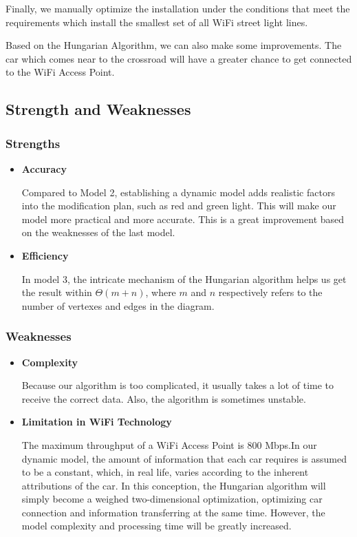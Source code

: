 \documentclass[12pt]{article}
\theoremstyle{definition}
\theoremstyle{remark}
\numberwithin{equation}{section}
\begin{document}
	Finally, we manually optimize the installation under the conditions that meet the requirements which install the smallest set of all WiFi street light lines.
	
	Based on the Hungarian Algorithm, we can also make some improvements. The car which comes near to the crossroad will have a greater chance to get connected to the WiFi Access Point.
	\subsection{Strength and Weaknesses}
	\subsubsection*{Strengths}
	\begin{itemize}
		\item \textbf{Accuracy}
		
		Compared to Model 2, establishing a dynamic model adds realistic factors into the modification plan, such as red and green light. This will make our model more practical and more accurate. This is a great improvement based on the weaknesses of the last model.
		\item \textbf{Efficiency}
		
		In model 3, the intricate mechanism of the Hungarian algorithm helps us get the result within $\Theta \left( m+n \right)$, where $m$ and $n$ respectively refers to the number of vertexes and edges in the diagram.
	\end{itemize}
	\subsubsection*{Weaknesses}
	\begin{itemize}
		\item \textbf{Complexity}
		
		Because our algorithm is too complicated, it usually takes a lot of time to receive the correct data. Also, the algorithm is sometimes unstable.
		\item \textbf{Limitation in WiFi Technology}
		
		The maximum throughput of a WiFi Access Point is 800 Mbps.In our dynamic model, the amount of information that each car requires is assumed to be a constant, which, in real life, varies according to the inherent attributions of the car.  In this conception, the Hungarian algorithm will simply become a weighed two-dimensional optimization, optimizing car connection and information transferring at the same time. However, the model complexity and processing time will be greatly increased.
	\end{itemize}
	
\end{document}
